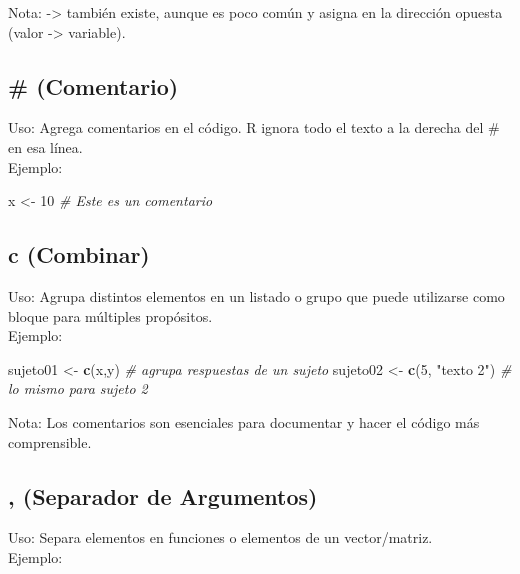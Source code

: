 \documentclass[
]{book}
\newenvironment{Shaded}{\begin{snugshade}}{\end{snugshade}}
\newcommand{\CommentTok}[1]{\textcolor[rgb]{0.56,0.35,0.01}{\textit{#1}}}
\newcommand{\DecValTok}[1]{\textcolor[rgb]{0.00,0.00,0.81}{#1}}
\newcommand{\FunctionTok}[1]{\textcolor[rgb]{0.13,0.29,0.53}{\textbf{#1}}}
\newcommand{\NormalTok}[1]{#1}
\newcommand{\OtherTok}[1]{\textcolor[rgb]{0.56,0.35,0.01}{#1}}
\newcommand{\StringTok}[1]{\textcolor[rgb]{0.31,0.60,0.02}{#1}}
\begin{document}
Nota: -\textgreater{} también existe, aunque es poco común y asigna en la dirección opuesta (valor -\textgreater{} variable).

\hypertarget{comentario}{%
\subsection{\# (Comentario)}\label{comentario}}

Uso: Agrega comentarios en el código. R ignora todo el texto a la derecha del \# en esa línea.\\
Ejemplo:

\begin{Shaded}
\begin{Highlighting}[]
\NormalTok{x }\OtherTok{\textless{}{-}} \DecValTok{10}  \CommentTok{\# Este es un comentario}
\end{Highlighting}
\end{Shaded}

\hypertarget{combinar}{%
\subsection{c (Combinar)}\label{combinar}}

Uso: Agrupa distintos elementos en un listado o grupo que puede utilizarse como bloque para múltiples propósitos.\\
Ejemplo:

\begin{Shaded}
\begin{Highlighting}[]
\NormalTok{sujeto01 }\OtherTok{\textless{}{-}} \FunctionTok{c}\NormalTok{(x,y)  }\CommentTok{\# agrupa respuestas de un sujeto}
\NormalTok{sujeto02 }\OtherTok{\textless{}{-}} \FunctionTok{c}\NormalTok{(}\DecValTok{5}\NormalTok{, }\StringTok{"texto 2"}\NormalTok{) }\CommentTok{\# lo mismo para sujeto 2}
\end{Highlighting}
\end{Shaded}

Nota: Los comentarios son esenciales para documentar y hacer el código más comprensible.

\hypertarget{separador}{%
\subsection{, (Separador de Argumentos)}\label{separador}}

Uso: Separa elementos en funciones o elementos de un vector/matriz.\\
Ejemplo:
\end{document}
